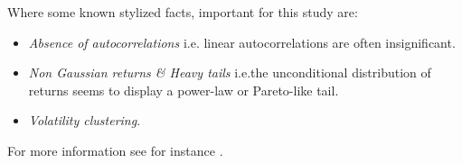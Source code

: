 \documentclass{kththesis}
\theoremstyle{definition}
\begin{document}
Where some known stylized facts, important for this study are:

\begin{itemize}
    \item \textit{Absence of autocorrelations} i.e. linear autocorrelations are often insignificant. 
    \item \textit{Non Gaussian returns \& Heavy tails} i.e.the unconditional distribution of returns seems to display a power-law or Pareto-like tail.
    \item \textit{Volatility clustering}. 
\end{itemize}
For more information see for instance \textcite{cont2001empirical}.


\end{document}
